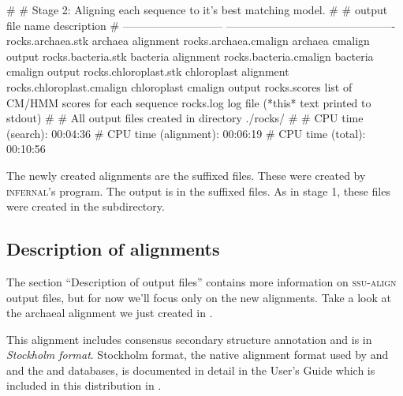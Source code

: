 \newpage

\begin{sreoutput}
#
# Stage 2: Aligning each sequence to it's best matching model.
#
# output file name             description
# ---------------------------  ----------------------------------------------
  rocks.archaea.stk            archaea alignment
  rocks.archaea.cmalign        archaea cmalign output
  rocks.bacteria.stk           bacteria alignment
  rocks.bacteria.cmalign       bacteria cmalign output
  rocks.chloroplast.stk        chloroplast alignment
  rocks.chloroplast.cmalign    chloroplast cmalign output
  rocks.scores                 list of CM/HMM scores for each sequence
  rocks.log                    log file (*this* text printed to stdout)
#
# All output files created in directory ./rocks/
#
# CPU time (search):     00:04:36
# CPU time (alignment):  00:06:19
# CPU time (total):      00:10:56
\end{sreoutput}

The newly created alignments are the  suffixed files. These
were created by \textsc{infernal}'s  program. The
 output is in the  suffixed files.  As in
stage 1, these files were created in the  subdirectory.

\subsection{Description of alignments}

The section ``Description of output files'' contains more information
on \textsc{ssu-align} output files, but for now we'll focus only on the new
alignments.  Take a look at the archaeal alignment we just created in
.

This alignment includes consensus secondary structure annotation and
is in \emph{Stockholm format}. 
Stockholm format, the native alignment format used by  and
 and the  and 
databases, is documented in detail in the  User's
Guide which is included in this distribution in
.

